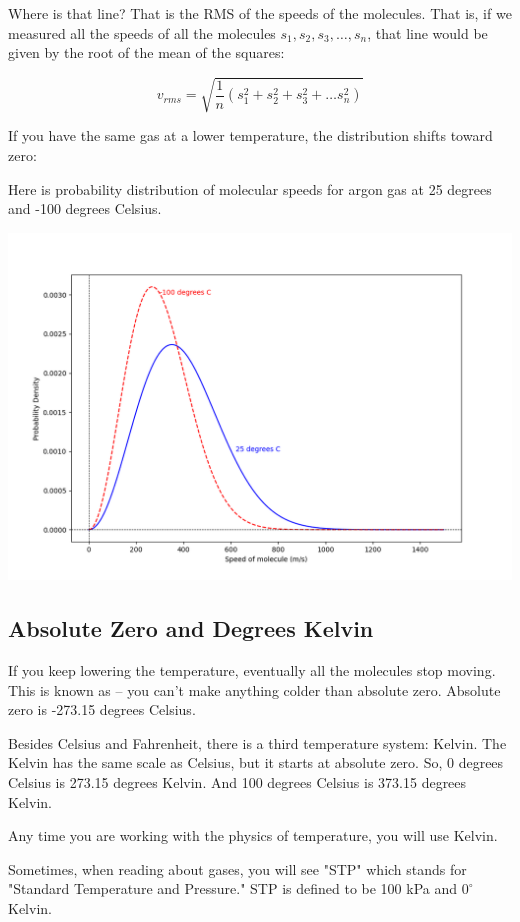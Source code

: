 Where is that line?  That is the RMS of the speeds of the molecules.  That is, if we measured all the speeds of all the molecules  $s_1, s_2, s_3, \ldots, s_n$, that line would be given by the root of the mean of the squares:

$$v_{rms} = \sqrt{\frac{1}{n} \left( s_1^2 + s_2^2 + s_3^2 + \ldots s_n^2 \right)}$$

If you have the same gas at a lower temperature, the distribution shifts toward zero:

Here is probability distribution of molecular speeds for argon gas at 25 degrees and -100 degrees Celsius.

\includegraphics[width=\textwidth]{ar2_plot.png}

\subsection{Absolute Zero and Degrees Kelvin}

If you keep lowering the temperature,  eventually all the molecules stop moving.  This is known as  -- you
 can't make anything colder than absolute zero.   Absolute zero is -273.15 degrees Celsius.
 
Besides Celsius and Fahrenheit, there is a third temperature system: Kelvin.  The Kelvin has the same scale as Celsius, but it starts at absolute zero.   
So,  0 degrees Celsius is 273.15 degrees Kelvin.    And 100 degrees Celsius is 373.15 degrees Kelvin.

Any time you are working with the physics of temperature, you will use Kelvin.

Sometimes, when reading about gases, you will see "STP"  which stands for "Standard Temperature and Pressure."  STP is defined to be 100 kPa and $0^\circ$ Kelvin.

